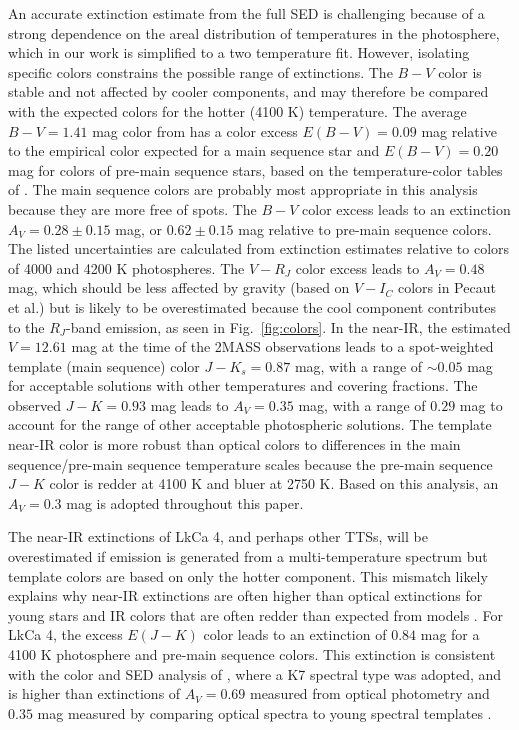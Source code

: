 \documentclass[twocolumn]{emulateapj}%
\begin{document}
An accurate extinction estimate from the full SED is challenging because of a strong dependence on the areal distribution of temperatures in the photosphere, which in our work is simplified to a two temperature fit.  However, isolating specific colors constrains the possible range of extinctions.  
The $B-V$ color is stable and not affected by cooler components, and may therefore be compared with the expected colors for the hotter (4100 K) temperature.  
The average $B-V=1.41$ mag color from \citet{grankin08} has a color excess $E(B-V)=0.09$ mag relative to the empirical color expected for a main sequence star and $E(B-V)=0.20$ mag for colors of pre-main sequence stars, based on the temperature-color tables of \citep{pecaut13}.  The main sequence colors are probably most 
appropriate in this analysis because they are more free of spots.  
The $B-V$ color 
excess leads to an extinction $A_V=0.28\pm0.15$ mag, or $0.62\pm0.15$ mag relative to 
pre-main sequence colors.   The listed uncertainties are calculated from extinction estimates relative to colors of 4000 and 4200 K photospheres.
The $V-R_J$ color excess leads to $A_V=0.48$ mag, which should be less affected by gravity (based on $V-I_C$ colors in Pecaut et al.) but is likely to be overestimated because the cool component contributes to the $R_J$-band emission, as seen in Fig.~\ref{fig:colors}.
In the near-IR, the estimated $V=12.61$ mag at the time of the 2MASS observations leads to a spot-weighted template (main sequence) color 
$J-K_s=0.87$ mag, with a range of $\sim 0.05$ mag for acceptable solutions with other 
temperatures and covering fractions. The observed $J-K=0.93$ mag leads to $A_V=0.35$ mag, 
with a range of $0.29$ mag to account for the range of other acceptable photospheric solutions.  
The template near-IR color is more robust than optical colors to differences 
in the main sequence/pre-main sequence temperature scales because the pre-main 
sequence $J-K$ color is redder at 4100 K and bluer at 2750 K.  Based on this 
analysis, an $A_V=0.3$ mag is adopted throughout this paper. 

The near-IR extinctions of LkCa 4, and perhaps other TTSs, will be overestimated if emission is generated from a multi-temperature spectrum but template colors are based on only the hotter component.  This mismatch likely explains why near-IR extinctions are often higher than optical extinctions for young stars \citep{herczeg14} and IR colors that are often redder than expected from models \citep{tottle15}.  For LkCa 4, the excess $E(J-K)$ color leads to an extinction of $0.84$ mag for a 4100 K photosphere and \citet{pecaut13} pre-main sequence colors.  This extinction is consistent with the color and SED analysis of \citet{furlan06}, where a K7 spectral type was adopted, and is higher than extinctions of $A_V=0.69$ measured from optical photometry \citep{kenyon95} and $0.35$ mag measured by comparing optical spectra to young spectral templates \citep{herczeg14}.  
\end{document}
